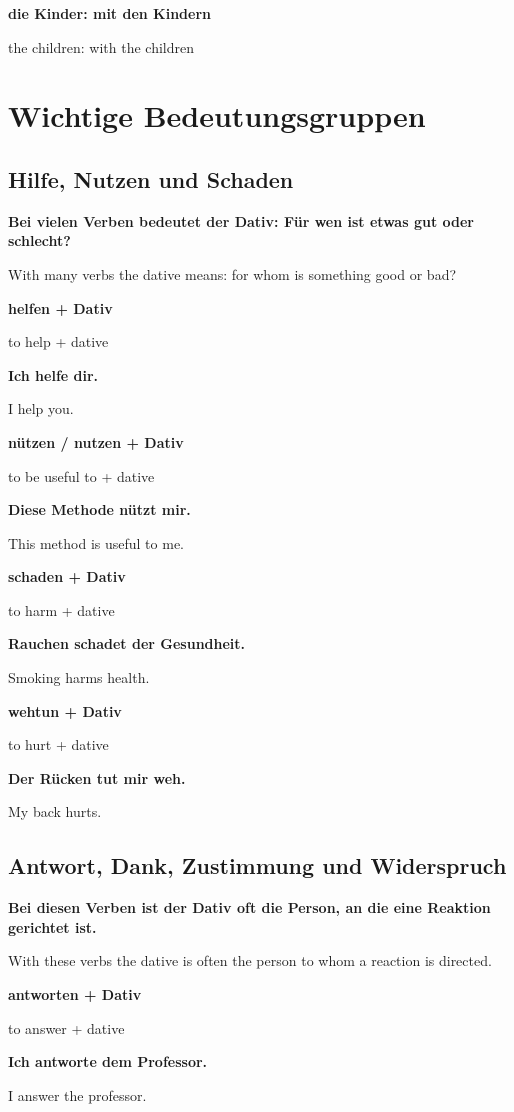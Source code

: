 \documentclass[a4paper]{article}
\newcommand{\EN}[1]{\par{\small\textcolor{TranslationGray}{#1}}\vspace{0.4em}}
\begin{document}
        \textbf{die Kinder: mit den Kindern}
        \EN{the children: with the children}
    
    
    \section{Wichtige Bedeutungsgruppen}
        
        \subsection{Hilfe, Nutzen und Schaden}
            
            \textbf{Bei vielen Verben bedeutet der Dativ: Für wen ist etwas gut oder schlecht?}
            \EN{With many verbs the dative means: for whom is something good or bad?}
            
            \textbf{helfen + Dativ}
            \EN{to help + dative}
            
            \textbf{Ich helfe dir.}
            \EN{I help you.}
            
            \textbf{nützen / nutzen + Dativ}
            \EN{to be useful to + dative}
            
            \textbf{Diese Methode nützt mir.}
            \EN{This method is useful to me.}
            
            \textbf{schaden + Dativ}
            \EN{to harm + dative}
            
            \textbf{Rauchen schadet der Gesundheit.}
            \EN{Smoking harms health.}
            
            \textbf{wehtun + Dativ}
            \EN{to hurt + dative}
            
            \textbf{Der Rücken tut mir weh.}
            \EN{My back hurts.}
        
        \subsection{Antwort, Dank, Zustimmung und Widerspruch}
            
            \textbf{Bei diesen Verben ist der Dativ oft die Person, an die eine Reaktion gerichtet ist.}
            \EN{With these verbs the dative is often the person to whom a reaction is directed.}
            
            \textbf{antworten + Dativ}
            \EN{to answer + dative}
            
            \textbf{Ich antworte dem Professor.}
            \EN{I answer the professor.}
            
\end{document}
